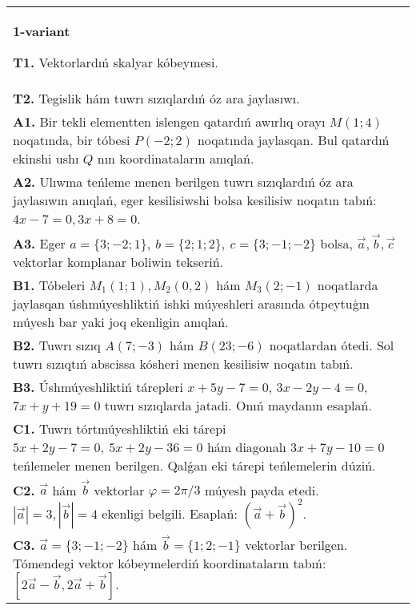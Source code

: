 \documentclass{article}
\begin{document}


\begin{tabular}{m{17cm}}
\textbf{1-variant}

\textbf{T1.} 
Vektorlardıń skalyar kóbeymesi.
 \\
\textbf{T2.} 
Tegislik hám tuwrı sızıqlardıń óz ara jaylasıwı.
 \\
\textbf{A1.} 
Bir tekli elementten islengen qatardıń awırlıq orayı
$M (1;4) $ noqatında, bir tóbesi $P (-2;2) $ noqatında jaylasqan. Bul
qatardıń ekinshi ushı $Q$ nın koordinataların anıqlań.
 \\
\textbf{A2.} 
Ulıwma teńleme menen berilgen tuwrı sızıqlardıń
óz ara jaylasıwın anıqlań, eger kesilisiwshi bolsa kesilisiw noqatın
tabıń: $4x-7=0, 3x+8=0$.
 \\
\textbf{A3.} 
Eger \(a = \{ 3; - 2;1\}, \ b = \{ 2;1;2\}, \ c = \{ 3; - 1; - 2\}\) bolsa, $\overrightarrow{a}, \overrightarrow{b}, \overrightarrow{c}$ vektorlar komplanar boliwin tekseriń.
 \\
\textbf{B1.} 
Tóbeleri \(M_{1} (1;1), M_{2} (0,2) \) hám
\(M_{3} (2;-1) \) noqatlarda jaylasqan úshmúyeshliktiń ishki
múyeshleri arasında ótpeytuģın múyesh bar yaki joq ekenligin anıqlań.
 \\
\textbf{B2.} 
Tuwrı sızıq \(A (7;-3) \) hám \(B (23;-6) \) noqatlardan ótedi.
Sol tuwrı sızıqtıń abscissa kósheri menen kesilisiw noqatın tabıń.
 \\
\textbf{B3.} 
Úshmúyeshliktiń tárepleri \(x+5y-7=0\),
\(3x-2y-4=0\), \(7x+y+19=0\) tuwrı sızıqlarda jatadi. Onıń
maydanın esaplań.
 \\
\textbf{C1.} 
Tuwrı tórtmúyeshliktiń eki tárepi
\(5x+2y-7=0,\ 5x+2y-36=0\) hám diagonalı
\(3x+7y-10=0\) teńlemeler menen berilgen. Qalǵan eki tárepi
teńlemelerin dúziń.
 \\
\textbf{C2.} 
$\vec{a}$ hám $\vec{b}$ vektorlar $\varphi = 2\pi/3$ múyesh payda etedi. $|\vec{a}| = 3,|\vec{b}| = 4$ ekenligi belgili. Esaplań:
$ (\vec{a} + \vec{b}) ^{2}$.
 \\
\textbf{C3.} 
$\vec{a} = \{ 3; - 1; - 2\}$ hám $\vec{b} = \{ 1;2; - 1\}$ vektorlar berilgen. Tómendegi vektor kóbeymelerdiń koordinataların tabıń:
$\left\lbrack 2\vec{a} - \vec{b},2\vec{a} + \vec{b} \right\rbrack$.
 \\

\end{tabular}
\vspace{1cm}
\end{document}
